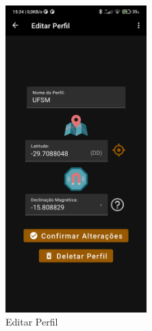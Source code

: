 \begin{figure}[H]
	\centering
	\caption{Telas de perfis}
	\label{telasperfis}
	\begin{subfigure}[b]{0.4\textwidth}
		\centering
		\includegraphics[width=0.6\textwidth]{figuras/desAplicativo/edit}
		\caption{Editar Perfil}
		\label{edit}
	\end{subfigure}
	\hfill
	\begin{subfigure}[b]{0.4\textwidth}
		\centering

\end{subfigure}
\end{figure}
